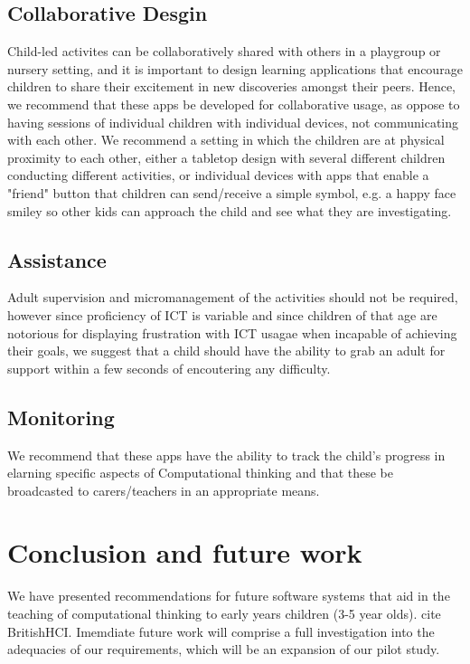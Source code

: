 \documentclass{sig-alternate}
\begin{document}
\subsection*{Collaborative Desgin} 
Child-led activites can be collaboratively shared with others in a playgroup or nursery setting, and it is important to design learning applications that encourage children to share their excitement in new discoveries amongst their peers. Hence, we recommend that these apps be developed for collaborative usage, as oppose to having sessions of individual children with individual devices, not communicating with each other. We recommend a setting in which the children are at physical proximity to each other,  either a tabletop design with several different children conducting different activities, or individual devices with apps that enable a "friend" button that children can send/receive a simple symbol, e.g. a happy face smiley so other kids can approach the child and see what they are investigating. 
\subsection*{Assistance}
Adult supervision and micromanagement of the activities should not be required, however since proficiency of ICT is variable and since children of that age are notorious for displaying frustration with ICT  usagae when incapable of achieving their goals, we suggest that a child should have the ability to grab an adult for support within a few seconds of encoutering any difficulty.
\subsection*{Monitoring}
We recommend that these apps have the ability to track the child's progress in elarning specific aspects of Computational thinking and that these be broadcasted to carers/teachers in an appropriate means. 

\section{Conclusion and future work}
We have presented recommendations for future software systems that aid in the teaching of computational thinking to early years children (3-5 year olds).
cite BritishHCI.
Imemdiate future work will comprise a full investigation into the adequacies of our requirements, which will be an expansion of our pilot study.


\end{document}
